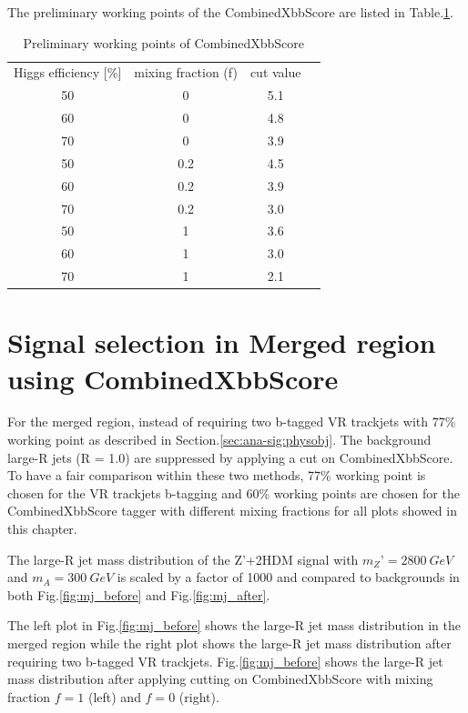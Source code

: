 The preliminary working points of the CombinedXbbScore are listed in Table.\ref{tab:combxbb}.

\begin{table}
    \footnotesize{
        \begin{center}
            \begin{tabular}{ c |c |c |c}
                \hline
                \hline

                Higgs efficiency [\%]	& mixing fraction (f)	& cut value \\
                50	&0	&5.1	 \\
                60	&0	&4.8	 \\
                70	&0	&3.9	 \\
                50	&0.2	&4.5	 \\
                60	&0.2	&3.9	 \\
                70	&0.2	&3.0	 \\
                50	&1	&3.6	 \\
                60	&1	&3.0	 \\
                70	&1	&2.1	\\
                \hline
                \hline
            \end{tabular}
        \end{center}
    }
    \caption{Preliminary working points of CombinedXbbScore}
    \label{tab:combxbb}
\end{table}


\section{Signal selection in Merged region using CombinedXbbScore}
\par For the merged region, instead of requiring two b-tagged VR trackjets  with 77\% working point as described in Section.\ref{sec:ana-sig:physobj}. The background large-R jets (R = 1.0) are suppressed by applying a cut on CombinedXbbScore. To have a fair comparison within these two methods, 77\% working point is chosen for the VR trackjets b-tagging and 60\% working points are chosen for the CombinedXbbScore tagger with different mixing fractions for all plots showed in this chapter.					
\par The large-R jet mass distribution of the Z’+2HDM signal with $m_Z’ = 2800~GeV$ and $m_A = 300~GeV$ is scaled by a factor of 1000 and compared to backgrounds in both Fig.\ref{fig:mj_before} and Fig.\ref{fig:mj_after}. 	
\par The left plot in Fig.\ref{fig:mj_before} shows the large-R jet mass distribution in the merged region while the right plot shows the large-R jet mass distribution after requiring two b-tagged VR trackjets. Fig.\ref{fig:mj_before} shows the large-R jet mass distribution after applying cutting on CombinedXbbScore with mixing fraction $f=1$ (left) and $f=0$ (right). 	

